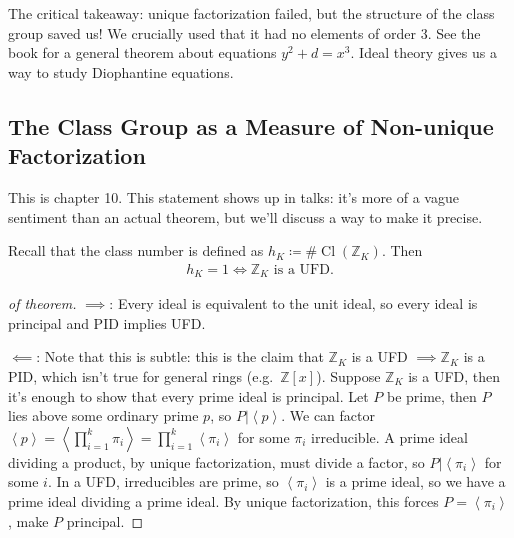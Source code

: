 \begin{remark}

The critical takeaway: unique factorization failed, but the structure of
the class group saved us! We crucially used that it had no elements of
order 3. See the book for a general theorem about equations
\(y^2 + d = x^3\). Ideal theory gives us a way to study Diophantine
equations.

\end{remark}

\hypertarget{the-class-group-as-a-measure-of-non-unique-factorization}{%
\subsection{The Class Group as a Measure of Non-unique
Factorization}\label{the-class-group-as-a-measure-of-non-unique-factorization}}

\begin{remark}

This is chapter 10. This statement shows up in talks: it's more of a
vague sentiment than an actual theorem, but we'll discuss a way to make
it precise.

\end{remark}

\begin{theorem}

Recall that the class number is defined as
\(h_K \coloneqq\# \operatorname{Cl}({\mathbb{Z}}_K)\). Then
\begin{align*}
h_K = 1 \iff {\mathbb{Z}}_K \text{ is a UFD}
.\end{align*}

\end{theorem}

\begin{proof}[of theorem]

\(\implies\): Every ideal is equivalent to the unit ideal, so every
ideal is principal and PID implies UFD.

\hfill\break

\(\impliedby\): Note that this is subtle: this is the claim that
\({\mathbb{Z}}_K\) is a UFD \(\implies {\mathbb{Z}}_K\) is a PID, which
isn't true for general rings (e.g.~\({\mathbb{Z}}[x]\)). Suppose
\({\mathbb{Z}}_K\) is a UFD, then it's enough to show that every prime
ideal is principal. Let \(P\) be prime, then \(P\) lies above some
ordinary prime \(p\), so
\(P \mathrel{\Big|}\left\langle{ p }\right\rangle\). We can factor
\(\left\langle{ p }\right\rangle= \left\langle{ \prod_{i=1}^k \pi_i }\right\rangle = \prod_{i=1}^k \left\langle{ \pi_i }\right\rangle\)
for some \(\pi_i\) irreducible. A prime ideal dividing a product, by
unique factorization, must divide a factor, so
\(P \mathrel{\Big|}\left\langle{ \pi_i }\right\rangle\) for some \(i\).
In a UFD, irreducibles are prime, so
\(\left\langle{ \pi_i }\right\rangle\) is a prime ideal, so we have a
prime ideal dividing a prime ideal. By unique factorization, this forces
\(P = \left\langle{ \pi_i }\right\rangle\), make \(P\) principal.

\end{proof}

